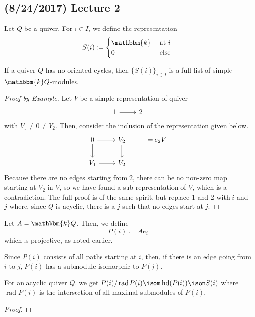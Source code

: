 \documentclass[11pt,leqno,oneside]{amsbook}
\numberwithin{thm}{section}
\newcommand{\bbk}{\mathbbm{k}} %
\renewcommand{\Q}{Q} %
\begin{document}
\subsection*{(8/24/2017) Lecture 2}
\begin{defn}
  Let \(\Q\) be a quiver. For \(i \in I\), we define the
  representation \[
    S(i) :=
    \begin{cases}
      \bbk & \text{ at }i \\
      0 & \text{ else }
    \end{cases}
  \]
\end{defn}
\begin{thm}
  If a quiver \(\Q\) has no oriented cycles, then \(\{S(i)\}_{i \in
    I}\) is a full list of simple \(\bbk \Q\)-modules. 
\end{thm}
\begin{proof}[Proof by Example]
  Let \(V\) be a simple representation of quiver \[
    \begin{tikzcd}
      1 \arrow[r] & 2
    \end{tikzcd}
  \]
  with \(V_1 \neq 0 \neq V_2\). Then, consider the inclusion of the
  representation given below.
  \[
    \begin{tikzcd}
      0 \arrow[r] \arrow[d] &  V_2 \arrow[d] & = e_2 V  \\
      V_1 \arrow[r] & V_2 &
    \end{tikzcd}
  \]
  Because there are no edges starting from \(2\), there can be no
  non-zero map starting at \(V_2\) in \(V\), so we have found a
  sub-representation of \(V\), which is a contradiction. The full
  proof is of the same spirit, but replace 1 and 2 with \(i\) and
  \(j\) where, since \(\Q\) is acyclic, there is a \(j\) such that no
  edges start at \(j\). 
\end{proof}
\begin{defn}
  Let \(A = \bbk \Q\). Then, we define \[
    P(i) := A e_i
  \]
  which is projective, as noted earlier.
\end{defn}
Since \(P(i)\) consists of all paths starting at \(i\), then, if there
is an edge going from \(i\) to \(j\), \(P(i)\) has a submodule
isomorphic to \(P(j)\).
\begin{prop}
  For an acyclic quiver \(\Q\), we get \(P(i)/\operatorname{rad} P(i)
  \isom \operatorname{hd}(P(i)) \isom S(i)\) where
  \(\operatorname{rad} P(i)\) is the intersection of all maximal
  submodules of \(P(i)\). 
\end{prop}
\begin{proof}
  
\end{proof}
\end{document}
